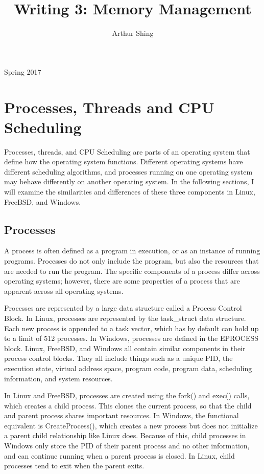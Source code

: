 \documentclass[journal, letterpaper, draftclsnofoot, onecolumn, 10pt]{IEEEtran}
\begin{document}
\title{Writing 3: Memory Management}
\author{Arthur Shing}


\begin{titlepage}
    \centering
    \maketitle
    \large Spring 2017



\end{titlepage}
\tableofcontents
\clearpage


\section{Processes, Threads and CPU Scheduling}

Processes, threads, and CPU Scheduling are parts of an operating system that define how the operating system functions. Different operating systems have different scheduling algorithms, and processes running on one operating system may behave differently on another operating system. In the following sections, I will examine the similarities and differences of these three components in Linux, FreeBSD, and Windows.

\subsection{Processes}

A process is often defined as a program in execution, or as an instance of running programs. Processes do not only include the program, but also the resources that are needed to run the program. The specific components of a process differ across operating systems; however, there are some properties of a process that are apparent across all operating systems.

Processes are represented by a large data structure called a Process Control Block. In Linux, processes are represented by the task\_struct data structure. Each new process is appended to a task vector, which has by default can hold up to a limit of 512 processes. In Windows, processes are defined in the EPROCESS block.  Linux, FreeBSD, and Windows all contain similar components in their process control blocks. They all include things such as a unique PID, the execution state, virtual address space, program code, program data, scheduling information, and system resources.

In Linux and FreeBSD, processes are created using the fork() and exec() calls, which creates a child process. This clones the current process, so that the child and parent process shares important resources. In Windows, the functional equivalent is CreateProcess(), which creates a new process but does not initialize a parent child relationship like Linux does. Because of this, child processes in Windows only store the PID of their parent process and no other information, and can continue running when a parent process is closed. In Linux, child processes tend to exit when the parent exits.
\end{document}
